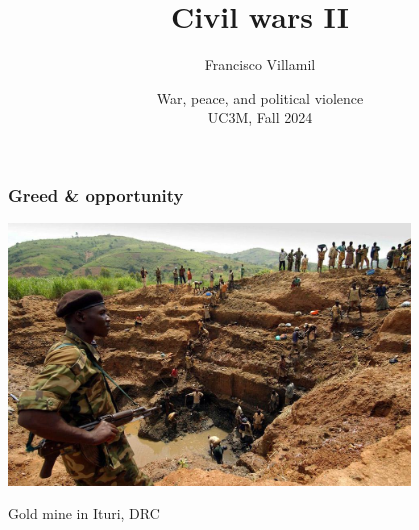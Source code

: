 \documentclass[aspectratio=43]{beamer}
\title{\huge Civil wars II}
\author{Francisco Villamil}
\date{War, peace, and political violence\\UC3M, Fall 2024}
\begin{document}
\begin{frame}
  \titlepage
\end{frame}

\begin{frame}
\frametitle{Greed \& opportunity}
\centering

\includegraphics[width = 0.8\textwidth]{img/conflict_diamonds}

\vspace{10pt}
{\small Gold mine in Ituri, DRC}

\end{frame}
\end{document}
